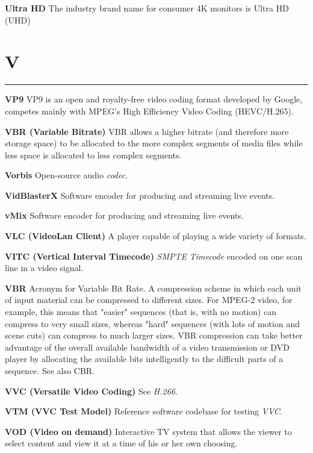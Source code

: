 \smallskip
\textbf{Ultra HD}
The industry brand name for consumer 4K monitors is Ultra HD (UHD)

\section{V}
\hrule

\smallskip
\textbf{VP9}
VP9 is an open and royalty-free video coding format developed by Google, competes mainly with MPEG's High Efficiency Video Coding (HEVC/H.265).

\smallskip
\textbf{VBR (Variable Bitrate)}
VBR allows a higher bitrate (and therefore more storage space) to be allocated to the more complex segments of media files while less space is allocated to less complex segments.

\smallskip
\textbf{Vorbis}
Open-source audio \textit{codec}.

\smallskip
\textbf{VidBlasterX}
Software encoder for producing and streaming live events.

\smallskip
\textbf{vMix}
Software encoder for producing and streaming live events.

\smallskip
\textbf{VLC (VideoLan Client)}
A player capable of playing a wide variety of formats.

\smallskip
\textbf{VITC (Vertical Interval Timecode)}
\textit{SMPTE} \textit{Timecode} encoded on one scan line in a video signal.

\smallskip
\textbf{VBR}
Acronym for Variable Bit Rate. A compression scheme in which each unit of input material can be compressed to different sizes. For MPEG-2 video, for example, this means that "easier" sequences (that is, with no motion) can compress to very small sizes, whereas "hard" sequences (with lots of motion and scene cuts) can compress to much larger sizes. VBR compression can take better advantage of the overall available bandwidth of a video transmission or DVD player by allocating the available bits intelligently to the difficult parts of a sequence. See also CBR.

\smallskip
\textbf{VVC (Versatile Video Coding)}
See \textit{H.266}.

\smallskip
\textbf{VTM (VVC Test Model)}
Reference software codebase for testing \textit{VVC}.

\smallskip
\textbf{VOD (Video on demand)}
Interactive TV system that allows the viewer to select content and view it at a time of his or her own choosing.



